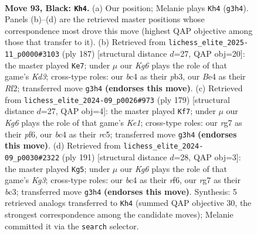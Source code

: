 \documentclass[11pt]{article}
\begin{document}
\clearpage

\begin{figure}[p]\centering
\begin{subfigure}{0.46\textwidth}\centering
\resizebox{\linewidth}{!}{%
\newchessgame
\chessboard[
  setfen={8/2N3R1/5P2/8/npB1b1P1/6k1/8/5K2 b - - 0 93},
  showmover=false,
  pgfstyle=straightmove, color=movearrow, markmove={g3-h4}
]}
\caption{}
\end{subfigure}\hfill
\begin{subfigure}{0.46\textwidth}\centering
\resizebox{\linewidth}{!}{%
\newchessgame
\chessboard[
  setfen={8/8/3kP3/8/1p6/1P1KR3/5r2/8 b - - 2 94},
  showmover=false,
  pgfstyle=straightmove, color=movearrow, markmove={d6-e7}
]}
\caption{}
\end{subfigure}
\\[4pt]
\begin{subfigure}{0.46\textwidth}\centering
\resizebox{\linewidth}{!}{%
\newchessgame
\chessboard[
  setfen={4k3/8/5P2/2R3P1/8/1p6/6r1/2K5 b - - 57 90},
  showmover=false,
  pgfstyle=straightmove, color=movearrow, markmove={e8-f7}
]}
\caption{}
\end{subfigure}\hfill
\begin{subfigure}{0.46\textwidth}\centering
\resizebox{\linewidth}{!}{%
\newchessgame
\chessboard[
  setfen={8/8/3K1Rk1/P7/2b5/2B5/8/7r b - - 42 96},
  showmover=false,
  pgfstyle=straightmove, color=movearrow, markmove={g6-g5}
]}
\caption{}
\end{subfigure}
\caption{\textbf{Move 93, Black: \texttt{Kh4}.} (a) Our position; Melanie plays \texttt{Kh4} (\texttt{g3h4}). Panels (b)--(d) are the retrieved master positions whose correspondence most drove this move (highest QAP objective among those that transfer to it). (b) Retrieved from \texttt{lichess\_elite\_2025-11\_p0000\#3103} (ply 187) [structural distance $d$=27, QAP obj=20]: the master played \texttt{Ke7}; under $\mu$ our \emph{Kg6} plays the role of that game's \emph{Kd3}; cross-type roles: our \emph{b}c4 as their \emph{p}b3, our \emph{B}e4 as their \emph{R}f2; transferred move \texttt{g3h4} \textbf{(endorses this move)}. (c) Retrieved from \texttt{lichess\_elite\_2024-09\_p0026\#973} (ply 179) [structural distance $d$=27, QAP obj=4]: the master played \texttt{Kf7}; under $\mu$ our \emph{Kg6} plays the role of that game's \emph{Ke1}; cross-type roles: our \emph{r}g7 as their \emph{p}f6, our \emph{b}c4 as their \emph{r}c5; transferred move \texttt{g3h4} \textbf{(endorses this move)}. (d) Retrieved from \texttt{lichess\_elite\_2024-09\_p0030\#2322} (ply 191) [structural distance $d$=28, QAP obj=3]: the master played \texttt{Kg5}; under $\mu$ our \emph{Kg6} plays the role of that game's \emph{Kg3}; cross-type roles: our \emph{b}c4 as their \emph{r}f6, our \emph{r}g7 as their \emph{b}c3; transferred move \texttt{g3h4} \textbf{(endorses this move)}. Synthesis: 5 retrieved analogs transferred to \texttt{Kh4} (summed QAP objective 30, the strongest correspondence among the candidate moves); Melanie committed it via the \texttt{search} selector.}
\label{fig:thought-m185}
\end{figure}
\end{document}
